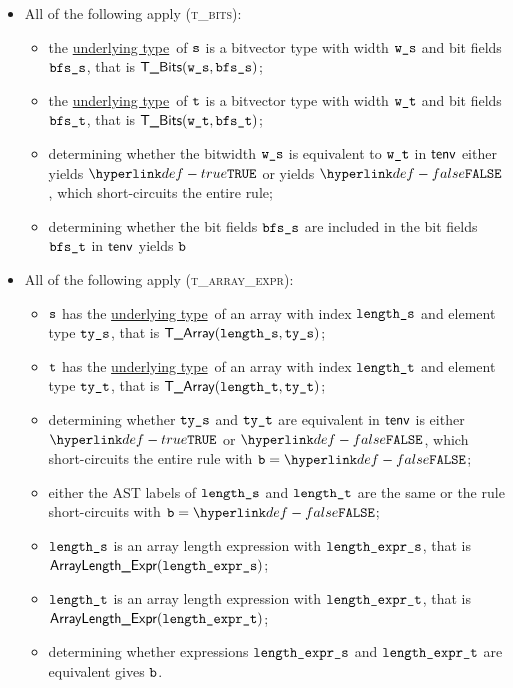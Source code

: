 \documentclass{book}
\newcommand\ProseOrTypeError[0]{\ProseTerminateAs{\TypeErrorConfig}}
\newcommand\underlyingtype[0]{\hyperlink{def-underlyingtype}{underlying type}}
\begin{document}
\begin{itemize}
\item All of the following apply (\textsc{t\_bits}):
  \begin{itemize}
  \item the \underlyingtype\ of $\texttt{s}$ is a bitvector type with width $\texttt{w\_s}$ and bit fields $\texttt{bfs\_s}$, that is $\textsf{T\_Bits}(\texttt{w\_s}, \texttt{bfs\_s})$;
  \item the \underlyingtype\ of $\texttt{t}$ is a bitvector type with width $\texttt{w\_t}$ and bit fields $\texttt{bfs\_t}$, that is $\textsf{T\_Bits}(\texttt{w\_t}, \texttt{bfs\_t})$;
  \item determining whether the bitwidth $\texttt{w\_s}$ is equivalent to $\texttt{w\_t}$ in $\textsf{tenv}$ either yields $\True$ or yields $\False$,
        which short-circuits the entire rule;
  \item determining whether the bit fields $\texttt{bfs\_s}$ are included in the bit fields $\texttt{bfs\_t}$ in $\textsf{tenv}$ yields $\texttt{b}$\ProseOrTypeError
  \end{itemize}

\item All of the following apply (\textsc{t\_array\_expr}):
  \begin{itemize}
  \item $\texttt{s}$ has the \underlyingtype\ of an array with index $\texttt{length\_s}$ and element type $\texttt{ty\_s}$, that is $\textsf{T\_Array}(\texttt{length\_s}, \texttt{ty\_s})$;
  \item $\texttt{t}$ has the \underlyingtype\ of an array with index $\texttt{length\_t}$ and element type $\texttt{ty\_t}$, that is $\textsf{T\_Array}(\texttt{length\_t}, \texttt{ty\_t})$;
  \item determining whether $\texttt{ty\_s}$ and $\texttt{ty\_t}$ are equivalent in $\textsf{tenv}$ is either $\True$
  or $\False$, which short-circuits the entire rule with $\vb=\False$;
  \item either the AST labels of $\texttt{length\_s}$ and $\texttt{length\_t}$ are the same or the rule short-circuits with $\vb=\False$;
  \item $\texttt{length\_s}$ is an array length expression with $\texttt{length\_expr\_s}$, that is \\ $\textsf{ArrayLength\_Expr}(\texttt{length\_expr\_s})$;
  \item $\texttt{length\_t}$ is an array length expression with $\texttt{length\_expr\_t}$, that is \\ $\textsf{ArrayLength\_Expr}(\texttt{length\_expr\_t})$;
  \item determining whether expressions $\texttt{length\_expr\_s}$ and $\texttt{length\_expr\_t}$ are equivalent gives $\texttt{b}$.
  \end{itemize}


\end{itemize}
\end{document}
